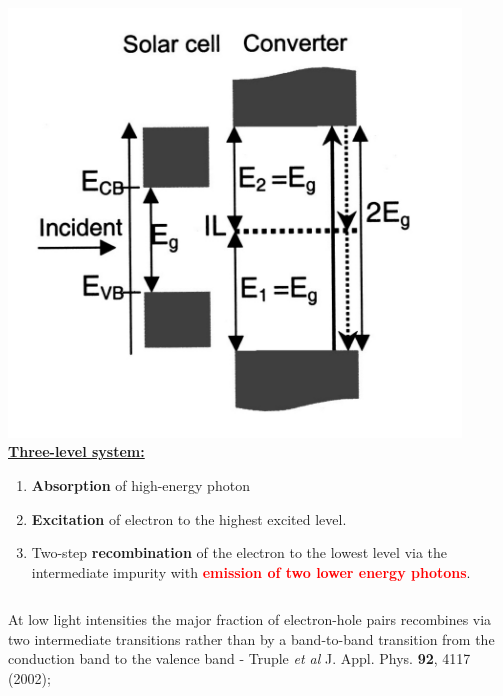 \documentclass{beamer}
\begin{document}
\begin{frame}
\begin{columns}
\begin{column}{0.45\textwidth}

 \begin{center}

  \includegraphics[width=0.9\textwidth]{figures/figure8_down-converter-scheme.jpeg} 
\vspace{-0.2cm}
\tiny\textbf{\underline{Three-level system:}}
\begin{enumerate}
 \item \textbf{Absorption} of high-energy photon
 \item \textbf{Excitation} of electron to the highest excited level.
 \item Two-step \textbf{recombination} of the electron to the lowest level via the intermediate impurity with \textcolor{red}{\textbf{emission of two lower energy photons}}.
\end{enumerate}

 \end{center}
\end{column}

\end{columns}

\vspace{0.1cm}

\tiny At low light intensities the major fraction of electron-hole pairs recombines via two intermediate transitions rather than by a band-to-band
transition from the conduction band to the valence band - Truple \textit{et al} J. Appl. Phys. \textbf{92}, 4117 (2002);
 
\end{frame}


\end{document}
